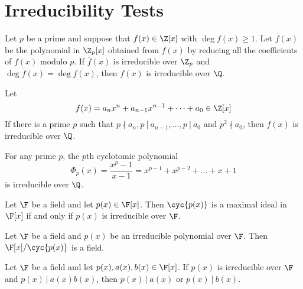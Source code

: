 \section{Irreducibility Tests}

\begin{theorem}
	Let $p$ be a prime and suppose that $f(x) \in \Z[x]$ with $\deg f(x) \geq 1$. Let $\overline{f}(x)$ be the polynomial in $\Z_p[x]$ obtained from $f(x)$ by reducing all the coefficients of $f(x)$ modulo $p$. If $\overline{f}(x)$ is irreducible over $\Z_p$ and $\deg \overline{f}(x) = \deg f(x)$, then $f(x)$ is irreducible over $\Q$.
\end{theorem}

\begin{theorem}
	Let
	\[ f(x) = a_nx^n + a_{n-1}x^{n-1} + \dots + a_0 \in \Z[x] \]
	\noindent If there is a prime $p$ such that $p \nmid a_n, p\ \vert\ a_{n-1}, \dots, p\ \vert\ a_0$ and $p^2 \nmid a_0$, then $f(x)$ is irreducible over $\Q$.
\end{theorem}

\begin{corollary}
	For any prime $p$, the $p$th cyclotomic polynomial
	\[ \Phi_p(x) = \frac{x^p - 1}{x-1} = x^{p-1} + x^{p-2} + \dots + x + 1 \]
	\noindent is irreducible over $\Q$.
\end{corollary}

\begin{theorem}
	Let $\F$ be a field and let $p(x) \in \F[x]$. Then $\cyc{p(x)}$ is a maximal ideal in $\F[x]$ if and only if $p(x)$ is irreducible over $\F$.
\end{theorem}

\begin{corollary}
	Let $\F$ be a field and $p(x)$ be an irreducible polynomial over $\F$. Then $\F[x]/\cyc{p(x)}$ is a field.
\end{corollary}

\begin{corollary}
	Let $\F$ be a field and let $p(x), a(x), b(x) \in \F[x]$. If $p(x)$ is irreducible over $\F$ and $p(x)\ \vert\ a(x)b(x)$, then $p(x)\ \vert\ a(x)$ or $p(x)\ \vert\ b(x)$.
\end{corollary}
